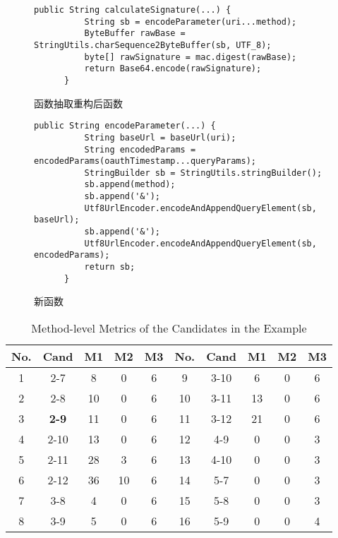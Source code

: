 \begin{figure}\label{after-code}
  \centering
    \begin{lstlisting}[columns=fullflexible,label={lst:label}]
   public String calculateSignature(...) {
          String sb = encodeParameter(uri...method);
          ByteBuffer rawBase = StringUtils.charSequence2ByteBuffer(sb, UTF_8);
          byte[] rawSignature = mac.digest(rawBase);
          return Base64.encode(rawSignature);
      }
    \end{lstlisting}
    \caption{函数抽取重构后函数}
\end{figure}

\begin{figure}\label{after-code}
  \centering
    \begin{lstlisting}[columns=fullflexible,label={lst:label}]
   public String encodeParameter(...) {
          String baseUrl = baseUrl(uri);
          String encodedParams = encodedParams(oauthTimestamp...queryParams);
          StringBuilder sb = StringUtils.stringBuilder();
          sb.append(method);
          sb.append('&');
          Utf8UrlEncoder.encodeAndAppendQueryElement(sb, baseUrl);
          sb.append('&');
          Utf8UrlEncoder.encodeAndAppendQueryElement(sb, encodedParams);
          return sb;
      }
    \end{lstlisting}
    \caption{新函数}
\end{figure}


\begin{table}[!t]
  \renewcommand{\arraystretch}{1.3}
  \caption{Method-level Metrics of the Candidates in the Example}
  \label{example_metrics}
  \centering
  \begin{tabular}{ccccc|ccccc}
  \toprule No. &Cand &M1 &M2 &M3 &No. &Cand &M1 &M2 &M3\\ \midrule 1 &2-7 &8 &0 &6
   &9 &3-10 &6 &0 &6\\
   2 &2-8 &10 &0 &6 &10 &3-11 &13 &0 &6\\
   3 &\textbf{2-9} &11 &0 &6 &11 &3-12 &21 &0 &6\\
   4 &2-10 &13 &0 &6 &12 &4-9 &0 &0 &3\\
   5 &2-11 &28 &3 &6 &13 &4-10 &0 &0 &3\\
   6 &2-12 &36 &10 &6 &14 &5-7 &0 &0 &3\\
   7 &3-8 &4 &0 &6 &15 &5-8 &0 &0 &3\\
   8 &3-9 &5 &0 &6 &16 &5-9 &0 &0 &4\\
   \bottomrule
  \end{tabular}
  \end{table}
  




